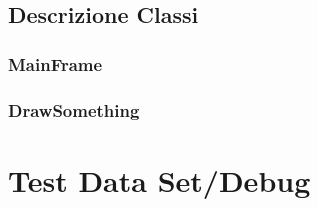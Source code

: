 \documentclass[a4paper,12pt,times,numbered,print,index]{article}
\begin{document}
\subsection{Descrizione Classi}
\subsubsection{MainFrame} %
\subsubsection{DrawSomething} %


\section{Test Data Set/Debug}

\printbibliography
\end{document}
